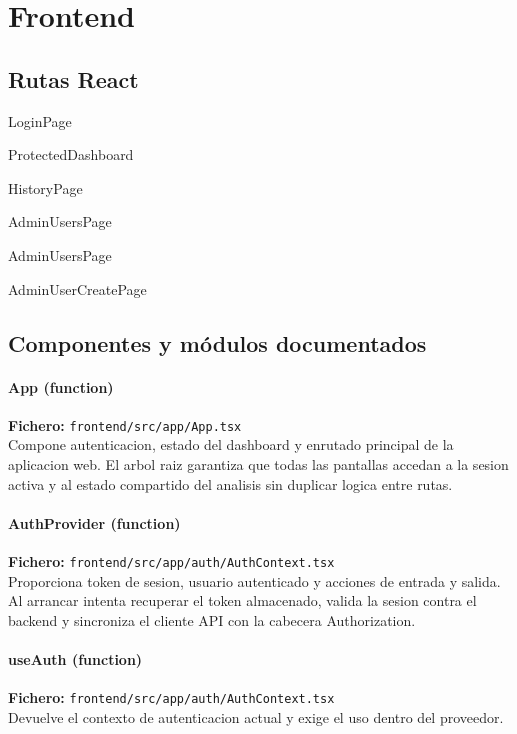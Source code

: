 \chapter{Frontend}


\section{Rutas React}
\begin{description}[leftmargin=2.8cm,style=nextline]
\item[/] LoginPage
\item[/dashboard] ProtectedDashboard
\item[/history] HistoryPage
\item[/admin/users] AdminUsersPage
\item[/admin/users/:userId] AdminUsersPage
\item[/admin/users/new] AdminUserCreatePage
\end{description}

\section{Componentes y módulos documentados}
\subsubsection*{App (function)}
\noindent\textbf{Fichero:} \texttt{frontend/src/app/App.tsx}\\
Compone autenticacion, estado del dashboard y enrutado principal de la aplicacion web. El arbol raiz garantiza que todas las pantallas accedan a la sesion activa y al estado compartido del analisis sin duplicar logica entre rutas.


\subsubsection*{AuthProvider (function)}
\noindent\textbf{Fichero:} \texttt{frontend/src/app/auth/AuthContext.tsx}\\
Proporciona token de sesion, usuario autenticado y acciones de entrada y salida. Al arrancar intenta recuperar el token almacenado, valida la sesion contra el backend y sincroniza el cliente API con la cabecera Authorization.


\subsubsection*{useAuth (function)}
\noindent\textbf{Fichero:} \texttt{frontend/src/app/auth/AuthContext.tsx}\\
Devuelve el contexto de autenticacion actual y exige el uso dentro del proveedor.


